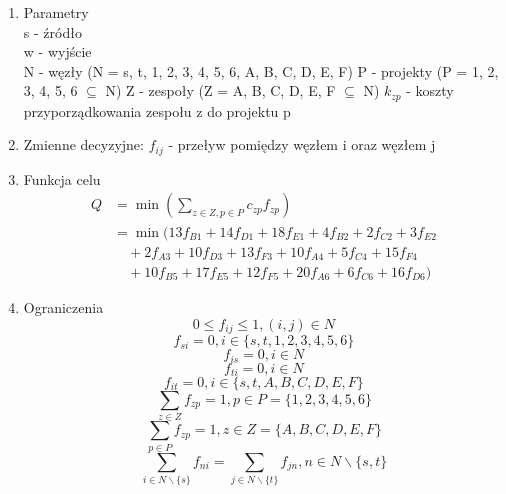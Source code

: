 \documentclass[12pt]{article}
\begin{document}
\begin{enumerate}
\item Parametry \\
s - źródło \\
w - wyjście \\
N - węzły (N = {s, t, 1, 2, 3, 4, 5, 6, A, B, C, D, E, F})
P - projekty (P = {1, 2, 3, 4, 5, 6} $\subseteq$ N)
Z - zespoły (Z = {A, B, C, D, E, F} $\subseteq$ N)
$k_{zp}$  - koszty przyporządkowania zespołu z do projektu p

\item Zmienne decyzyjne:
$f_{ij}$ - przeływ pomiędzy węzłem i oraz węzłem j
\item Funkcja celu
\begin{align*}
    Q &= \min \left(\sum_{z \in Z, p \in P} c_{zp}f_{zp} \right) \\
    &= \min \big( 13f_{B1} + 14f_{D1} + 18f_{E1} + 4f_{B2} + 2f_{C2} + 3f_{E2} \\
    &\quad + 2f_{A3} + 10f_{D3} + 13f_{F3} + 10f_{A4} + 5f_{C4} + 15f_{F4} \\
    &\quad + 10f_{B5} + 17f_{E5} + 12f_{F5} + 20f_{A6} + 6f_{C6} + 16f_{D6} \big)
\end{align*}


\item Ograniczenia
\setcounter{equation}{0}
\begin{equation}
0 \leq f_{ij} \leq 1, (i, j) \in N
\end{equation}
\begin{equation}
f_{si} = 0, i \in \{ s, t, 1, 2, 3, 4, 5, 6 \}
\end{equation}
\begin{equation}
f_{is} = 0, i \in N
\end{equation}
\begin{equation}
f_{ti} = 0, i \in N
\end{equation}
\begin{equation}
f_{it} = 0, i \in \{s, t, A, B, C, D, E, F\}
\end{equation}
\begin{equation}
\sum_{z \in Z} f_{zp} = 1, p \in P = \{ 1, 2, 3, 4, 5, 6 \}
\end{equation}
\begin{equation}
\sum_{p \in P} f_{zp} = 1, z \in Z = \{ A, B, C, D, E, F \}
\end{equation}
\begin{equation}
\sum_{i \in N \backslash \{s\}} f_{ni} = \sum_{j \in N \backslash \{t\}} f_{jn}, n \in N \backslash \{ s, t \}
\end{equation}

\end{enumerate}
\end{document}
